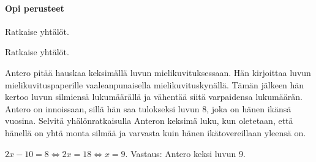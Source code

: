 \begin{tehtavasivu}

\paragraph*{Opi perusteet}

\begin{tehtava}
    Ratkaise yhtälöt.
    \begin{alakohdat}
    \end{alakohdat}
    \begin{vastaus}
        \begin{alakohdat}
        \end{alakohdat}
    \end{vastaus}
\end{tehtava}

\begin{tehtava}
    Ratkaise yhtälöt.
    \begin{alakohdat}
    \end{alakohdat}
    \begin{vastaus}
        \begin{alakohdat}
        \end{alakohdat}
    \end{vastaus}
\end{tehtava}

\begin{tehtava}
    Antero pitää hauskaa keksimällä luvun mielikuvituksessaan. Hän kirjoittaa
    luvun mielikuvituspaperille vaaleanpunaisella mielikuvituskynällä. Tämän jälkeen hän
    kertoo luvun silmiensä lukumäärällä ja vähentää siitä varpaidensa lukumäärän. Antero
    on innoissaan, sillä hän saa tulokseksi luvun 8, joka on hänen ikänsä vuosina. Selvitä
    yhälönratkaisulla Anteron keksimä luku, kun oletetaan, että hänellä on yhtä monta silmää
    ja varvasta kuin hänen ikätovereillaan yleensä on.
    \begin{vastaus}
        $2x-10=8 \Leftrightarrow 2x=18 \Leftrightarrow x=9$. Vastaus: Antero keksi luvun 9.
    \end{vastaus}
\end{tehtava}


\end{tehtavasivu}
